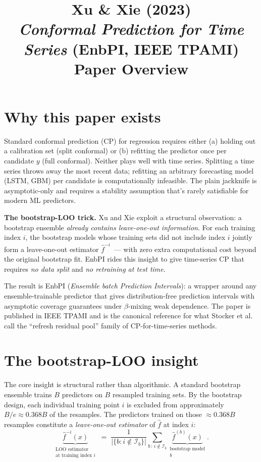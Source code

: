 \documentclass[letterpaper,11pt,leqno]{article}
\title{Xu \& Xie (2023)\\\textit{Conformal Prediction for Time Series} (EnbPI, IEEE TPAMI)\\[2pt]\large Paper Overview}
\author{}
\date{}
\begin{document}
\maketitle

\section{Why this paper exists}\label{s:intro}

Standard conformal prediction (CP) for regression requires either (a) holding out a calibration set (split conformal) or (b) refitting the predictor once per candidate $y$ (full conformal). Neither plays well with time series. Splitting a time series throws away the most recent data; refitting an arbitrary forecasting model (LSTM, GBM) per candidate is computationally infeasible. The plain jackknife is asymptotic-only and requires a stability assumption that's rarely satisfiable for modern ML predictors.

\begin{keyinsight}
\textbf{The bootstrap-LOO trick.} Xu and Xie \cite{xu2023enbpi} exploit a structural observation: a bootstrap ensemble \emph{already contains leave-one-out information}. For each training index $i$, the bootstrap models whose training sets did not include index $i$ jointly form a leave-one-out estimator $\hat{f}^{-i}$~--- with zero extra computational cost beyond the original bootstrap fit. EnbPI rides this insight to give time-series CP that requires \emph{no data split} and \emph{no retraining at test time}.
\end{keyinsight}

The result is EnbPI (\emph{Ensemble batch Prediction Intervals}): a wrapper around any ensemble-trainable predictor that gives distribution-free prediction intervals with asymptotic coverage guarantees under $\beta$-mixing weak dependence. The paper is published in IEEE TPAMI and is the canonical reference for what Stocker et al.\ \cite{stocker2025gentle} call the ``refresh residual pool'' family of CP-for-time-series methods.

\section{The bootstrap-LOO insight}\label{s:insight}

The core insight is structural rather than algorithmic. A standard bootstrap ensemble trains $B$ predictors on $B$ resampled training sets. By the bootstrap design, each individual training point $i$ is excluded from approximately $B/e \approx 0.368 B$ of the resamples. The predictors trained on those $\approx 0.368 B$ resamples constitute a \emph{leave-one-out estimator} of $\hat{f}$ at index $i$:
\begin{equation*}
\underbrace{\hat{f}^{-i}(x)}_{\substack{\text{LOO estimator}\\\text{at training index } i}}
\;=\;
\frac{1}{|\{b : i \notin \mathcal{I}_b\}|}
\sum_{b\,:\,i \notin \mathcal{I}_b}
\underbrace{\hat{f}^{(b)}(x)}_{\substack{\text{bootstrap model}\\b}}.
\end{equation*}
\end{document}
